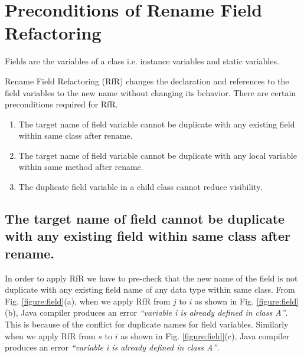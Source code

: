 \section{\textbf{Preconditions of Rename Field Refactoring}}
Fields are the variables of a class i.e. instance variables and static variables.

Rename Field Refactoring (RfR) changes the declaration and references to the field variables to the new name without changing its behavior.
There are certain preconditions required for RfR.

\begin{enumerate}
	\item The target name of field variable cannot be duplicate with any existing field within same class after rename.
	\item The target name of field variable cannot be duplicate with any local variable within same method after rename.
	\item The duplicate field variable in a child class cannot reduce visibility. 
\end{enumerate}

\subsection{The target name of field cannot be duplicate with any existing field within same class after rename.}

In order to apply RfR we have to pre-check that the new name of the field is not duplicate with any existing field name of any data type within same class. From Fig. \ref{figure:field}(a), when we apply RfR from $j$ to $i$ as shown in Fig. \ref{figure:field}(b), Java compiler produces an error \textit{``variable i is already defined in class A''}. This is because of the conflict for duplicate names for field variables. Similarly when we apply RfR from $s$ to $i$ as shown in Fig. \ref{figure:field}(c), Java compiler produces an error \textit{``variable i is already defined in class A''}. 

